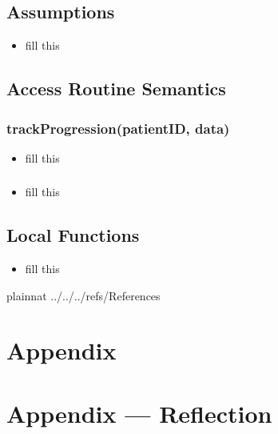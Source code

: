 \documentclass[12pt, titlepage]{article}
\begin{document}
\subsection{Assumptions}
\begin{itemize}
    \item fill this
\end{itemize}

\subsection{Access Routine Semantics}
\subsubsection{trackProgression(patientID, data)}

\begin{itemize}
    \item fill this
\end{itemize}

\subsubsection{}

\begin{itemize}
    \item fill this
\end{itemize}


\subsection{Local Functions}
\begin{itemize}
    \item fill this
\end{itemize}

 {plainnat}
 {../../../refs/References}

\newpage

\section{Appendix} \label{Appendix}


\newpage{}

\section*{Appendix --- Reflection}
\end{document}
